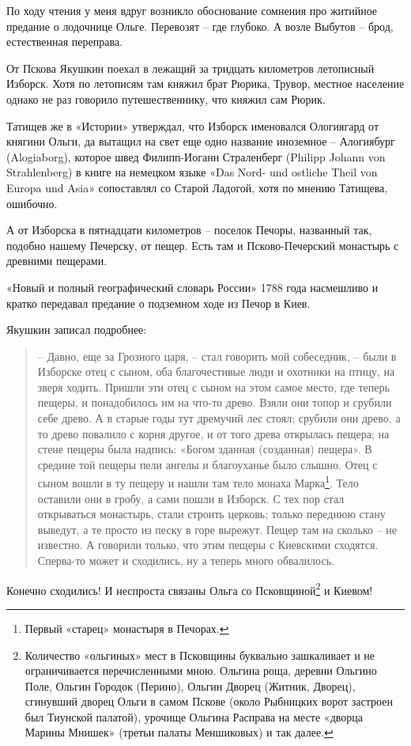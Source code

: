 По ходу чтения у меня вдруг возникло обоснование сомнения про житийное предание о лодочнице Ольге. Перевозят – где глубоко. А возле Выбутов – брод, естественная переправа.

От Пскова Якушкин поехал в лежащий за тридцать километров летописный Изборск. Хотя по летописям там княжил брат Рюрика, Трувор, местное население однако не раз говорило путешественнику, что княжил сам Рюрик. 

Татищев же в «Истории» утверждал, что Изборск именовался Ологиягард от княгини Ольги, да вытащил на свет еще одно название иноземное – Алогиябург (Alogiaborg), которое швед Филипп-Иоганн Страленберг (Philipp Johann von Strahlenberg) в книге на немецком языке «Das Nord- und ostliche Theil von Europa und Asia» сопоставлял со Старой Ладогой, хотя по мнению Татищева, ошибочно.

А от Изборска в пятнадцати километров – поселок Печоры, названный так, подобно нашему Печерску, от пещер. Есть там и Псково-Печерский монастырь с древними пещерами. 

«Новый и полный географический словарь России» 1788 года насмешливо и кратко передавал предание о подземном ходе из Печор в Киев.

Якушкин записал подробнее:

\begin{quotation}
 – Давно, еще за Грозного царя, – стал говорить мой собеседник, – были в Изборске отец с сыном, оба благочестивые люди и охотники на птицу, на зверя ходить. Пришли эти отец с сыном на этом самое место, где теперь пещеры, и понадобилось им на что-то древо. Взяли они топор и срубили себе древо. А в старые годы тут дремучий лес стоял; срубили они древо, а то древо повалило с корня другое, и от того древа открылась пещера; на стене пещеры была надпись: «Богом зданная (созданная) пещера». В средине той пещеры пели ангелы и благоуханье было слышно. Отец с сыном вошли в ту пещеру и нашли там тело монаха Марка\footnote{Первый «старец» монастыря в Печорах.}. Тело оставили они в гробу, а сами пошли в Изборск. С тех пор стал открываться монастырь, стали строить церковь; только переднюю стану выведут, а те просто из песку в горе вырежут. Пещер там на сколько – не известно. А говорили только, что этим пещеры с Киевскими сходятся. Сперва-то может и сходились, ну а теперь много обвалилось.
\end{quotation}

Конечно сходились! И неспроста связаны Ольга со Псковщиной\footnote{Количество «ольгиных» мест в Псковщины буквально зашкаливает и не ограничивается перечисленными мною. Ольгина роща, деревни Ольгино Поле, Ольгин Городок (Перино), Ольгин Дворец (Житник, Дворец), сгинувший дворец Ольги в самом Пскове (около  Рыбницких ворот застроен был Тиунской палатой), урочище Ольгина Расправа на месте «дворца Марины Мнишек» (третьи палаты Меншиковых) и так далее.} и Киевом!

